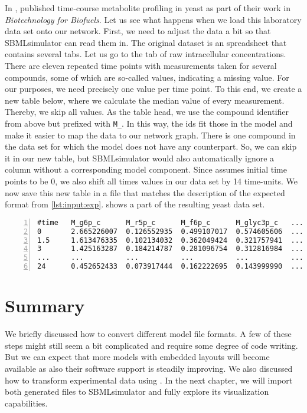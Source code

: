 In \citeyear{Bergdahl2012}, \citeauthor{Bergdahl2012} published time-course metabolite profiling in yeast as part of their work in \emph{Biotechnology for Biofuels}.
Let us see what happens when we load this laboratory data set onto our network.
First, we need to adjust the data a bit so that SBMLsimulator can read them in.
The original dataset is an \Excel spreadsheet that contains several tabs.
Let us go to the tab of raw intracellular concentrations.
There are eleven repeated time points with measurements taken for several compounds, some of which are so-called \NaN values, indicating a missing value.
For our purposes, we need precisely one value per time point.
To this end, we create a new table below, where we calculate the median value of every measurement.
Thereby, we skip all \NaN values.
As the table head, we use the compound identifier from above but prefixed with \texttt{M\_}.
In this way, the ids fit those in the \SBML model and make it easier to map the data to our network graph.
There is one compound in the data set for which the model does not have any counterpart.
So, we can skip it in our new table, but SBMLsimulator would also automatically ignore a column without a corresponding model component.
Since \SBML assumes initial time points to be 0, we also shift all times values in our data set by 14\textonehalf{} time-units.
We now save this new table in a \CSV file that matches the description of the expected format from \cref{lst:input:exp}.
 shows a part of the resulting yeast data set.
\begin{lstlisting}[caption={Part of the example yeast data set in \CSV format},label={lst:yeastexp},numbers=left,captionpos=t]
#time   M_g6p_c      M_r5p_c      M_f6p_c      M_glyc3p_c   ...
0       2.665226007  0.126552935  0.499107017  0.574605606  ...
1.5     1.613476335  0.102134032  0.362049424  0.321757941  ...
3       1.425163287  0.184214787  0.281096754  0.312816984  ...
...     ...          ...          ...          ...          ...
24      0.452652433  0.073917444  0.162222695  0.143999990  ...
\end{lstlisting}

\section{Summary}

We briefly discussed how to convert different model file formats.
A few of these steps might still seem a bit complicated and require some degree of code writing.
But we can expect that more models with embedded layouts will become available as also their software support is steadily improving.
We also discussed how to transform experimental data using \Excel.
In the next chapter, we will import both generated files to SBMLsimulator and fully explore its visualization capabilities.

